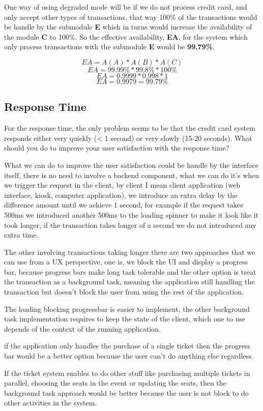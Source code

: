 \noindent
One way of using degraded mode will be if we do not process credit card, and only
accept other types of transactions, that way 100\% of the transactions would be 
handle by the submodule \textbf{E} which in turns would increase the availability
of the module \textbf{C} to 100\%. So the effective availability, \textbf{EA}, 
for the system which only process transactions with the 
submodule \textbf{E} would be \textbf{99.79\%}.

\[ EA = A(A) * A(B) * A(C) \]
\[ EA =  99.99\% * 99.8\% * 100\%\]
\[ EA =  0.9999 * 0.998 * 1\]
\[ EA = 0.9979 = 99.79\%\]

\pagebreak

\subsection{Response Time}
For the response time, the only problem seems to be that the credit card 
system responds either very quickly (< 1 second) or very slowly 
(15-20 seconds).  What should you do to improve your user satisfaction with 
the response time?\newline

\noindent
What we can do to improve the user satisfaction could be handle by the interface 
itself, there is no need to involve a backend component, what we can do it's 
when we trigger the request in the client, by client I mean client application 
(web interface, kiosk, computer application), we introduce an extra delay by 
the difference amount until we achieve 1 second, for example if the request takes
500ms we introduced another 500ms to the loading spinner to make it look like 
it took longer, if the transaction takes longer of a second we do not introduced 
any extra time. \newline

\noindent 
The other involving transactions taking longer there are two approaches that we
can use from a UX perspective, one is, we block the UI and display a progress 
bar, because progress bars make long task tolerable and the other option is treat 
the transaction as a background task, meaning the application still handling the 
transaction but doesn't block the user from using the rest of the application.\newline

\noindent 
The loading blocking progressbar is easier to implement, the other background task 
implementation requires to keep the state of the client, which one to use 
depends of the context of the running application. \newline

\noindent
if the application only handles the purchase of a single ticket then the 
progress bar would be a better option because the user can't do anything else regardless. \newline

\noindent
If the ticket system enables to do other stuff like purchasing multiple tickets in parallel, 
choosing the seats in the event or updating the seats, then the background task 
approach would be better because the user is not block to do other activities 
in the system.

